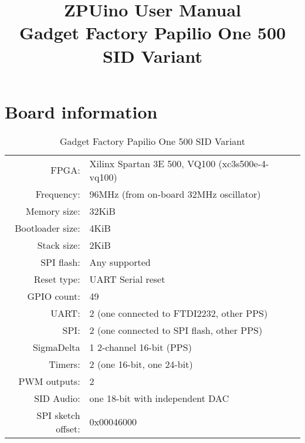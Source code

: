 \documentclass[12pt,a4paper,openany,smallheadings,headinclude,headsepline,final]{scrreprt}
\def \board {Gadget Factory Papilio One 500 SID Variant }
\begin{document}

\parindent 0cm
\parskip 0.2cm

\title{ZPUino User Manual\\ \board}
\maketitle

\tableofcontents
\clearpage

\chapter{Board information}

\begin{table}[H]
\begin{center}
\begin{tabularx}{14cm}{rX}
FPGA:              & Xilinx Spartan 3E 500, VQ100 (xc3s500e-4-vq100)\\
Frequency:         & 96MHz (from on-board 32MHz oscillator)\\
Memory size:       & 32KiB \\
Bootloader size:   & 4KiB \\
Stack size:        & 2KiB \\
SPI flash:         & Any supported \\
Reset type:        & UART Serial reset \\
GPIO count:        & 49 \\
UART:              & 2 (one connected to FTDI2232, other PPS) \\
SPI:               & 2 (one connected to SPI flash, other PPS) \\
SigmaDelta         & 1 2-channel 16-bit (PPS) \\
Timers:            & 2 (one 16-bit, one 24-bit) \\
PWM outputs:       & 2     \\
SID Audio:         & one 18-bit with independent DAC \\
SPI sketch offset: & 0x00046000
\end{tabularx}
\caption{\board}
\end{center}
\end{table}
\end{document}
